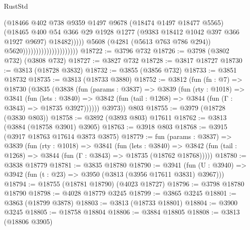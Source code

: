 \begin{lexlean}{RustStd}
\begin{coremodule}
                                                    (@18466
                                                      @402
                                                      @738
                                                      @9359
                                                      @1497
                                                      @9678
                                                      (@18474 @1497 @18477 @5565)
                                                      (@18465
                                                        @400
                                                        @54
                                                        @366
                                                        @29
                                                        @1928
                                                        @1277
                                                        (@9383 @18412 @1042 @397 @366 @1927 @9697)
                                                        @18482)))))
                                              @5608
                                              (@4281 (@5613 @763 @786 @294))
                                              @5620)))))))))))))))))))))
@18722 := @3796 @732
@18726 := @3798 (@3802 @732) (@3808 @732)
@18727 := @3827 @732
@18728 := @3817 @18727
@18730 := @3813 (@18728 @3832)
@18732 := @3855 (@3856 @732)
@18733 := @3851 @18732
@18735 := @3813 (@18733 @3880)
@18752 := @3812
    (fun (fn : @7) =>
    @18730
      (@3835
        (@3838
          (fun (params : @3837) =>
          @3839
            (fun (rty : @1018) =>
            @3841
              (fun (lets : @3840) =>
              @3842 (fun (tail : @1268) => @3844 (fun (Γ : @3843) => @18735 @3927))))))
        @3973))
    @803
@18755 := @3979 (@18728 (@3830 @803))
@18758 := @3892 (@3893 @803) @17611
@18762 := @3813 (@3884 (@18758 @3901) @3905)
@18763 := @3918 @803
@18768 := @3915 (@3917 @18763 @17614 @3873 @3875)
@18779 := fun (params : @3837) =>
  @3839
    (fun (rty : @1018) =>
    @3841
      (fun (lets : @3840) =>
      @3842 (fun (tail : @1268) => @3844 (fun (Γ : @3843) => @18735 (@18762 @18768)))))
@18780 := @3838 @18779
@18781 := @3835 @18780
@18790 := @3941
    (fun (U : @3940) => @3942 (fun (t : @23) => @3950 (@3813 (@3956 @17611 @3831) @3967)))
@18794 := @18755 (@18781 @18790) (@4023 @18727)
@18796 := @3798 @18780 @18790
@18798 := @4028 @18779 @3245
@18799 := @3865 @3245
@18801 := @3863 (@18799 @3878)
@18803 := @3813 (@18733 @18801)
@18804 := @3900 @3245
@18805 := @18758 @18804
@18806 := @3884 @18805
@18808 := @3813 (@18806 @3905)

\end{coremodule}
\end{lexlean}
